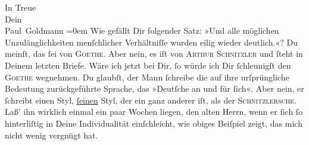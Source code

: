 \pstart
           In Treue {\\[\baselineskip]}Dein {\\[\baselineskip]}\spacefill\mbox{Paul Goldmann}\pend
           \leftskip=0em{}
\pstart
           \noindent{}Wie gefällt Dir folgender Satz: »Und alle möglichen Unzulänglichkeiten
                  menſchlicher Verhältniſſe wurden eilig wieder deutlich.«? Du meinſt, das ſei von
                     \textsc{Goethe}. Aber nein, es iſt von \textsc{Arthur Schnitzler} und ſteht
                  in Deinem letzten Briefe. Wäre ich jetzt bei Dir, ſo würde ich Dir ſchleunigſt den
                     \textsc{Goethe} wegnehmen. Du glaubſt, der Mann ſchreibe  die auf ihre urſprüngliche Bedeutung zurückgeführte Sprache, das »Deutſche
                  an {\pb}und für ſich«. Aber nein, er ſchreibt einen
                  Styl, \uline{ſeinen} Styl, der ein ganz anderer iſt, als
                  der \textsc{Schnitzlersche}. Laß’ ihn wirklich einmal ein paar
                  Wochen liegen, den alten Herrn, wenn er ſich ſo hinterliſtig in Deine
                  Individualität einſchleicht, wie obiges Beiſpiel zeigt, das mich nicht wenig
                  vergnügt hat.\pend
           \endnumbering{}  
      